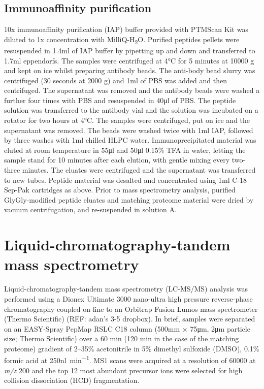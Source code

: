 \subsection{Immunoaffinity purification}
10x immunoaffinity purification (IAP) buffer provided with PTMScan Kit was diluted to 1x concentration with MilliQ-H\textsubscript{2}O.
Purified peptides pellets were resuspended in 1.4ml of IAP buffer by pipetting up and down and transferred to 1.7ml eppendorfs.
The samples were centrifuged at 4\si{\degreeCelsius} for 5 minutes at 10000 g and kept on ice whilst preparing antibody beads.
The anti-body bead slurry was centrifuged (30 seconds at 2000 g) and 1ml of PBS was added and then centrifuged.
The supernatant was removed and the antibody beads were washed a further four times with PBS and resuspended in 40\si{\ul} of PBS.
The peptide solution was transferred to the antibody vial and the solution was incubated on a rotator for two hours at 4\si{\degreeCelsius}.
The samples were centrifuged, put on ice and the supernatant was removed.
The beads were washed twice with 1ml IAP, followed by three washes with 1ml chilled HLPC water.
Immunoprecipitated material was eluted at room temperature in 55\si{\ul} and 50\si{\ul} 0.15\% TFA in water, letting the sample stand for 10 minutes after each elution, with gentle mixing every two-three minutes.
The eluates were centrifuged and the supernatant was transferred to new tubes.
Peptide material was desalted and concentrated using 1\si{\ml} C-18 Sep-Pak cartridges as above.
Prior to mass spectrometry analysis, purified GlyGly-modified peptide eluates and matching proteome material were dried by vacuum centrifugation, and re-suspended in solution A.
%

\section{Liquid-chromatography-tandem mass spectrometry}
Liquid-chromatography-tandem mass spectrometry (LC-MS/MS) analysis was performed using a Dionex Ultimate 3000 nano-ultra high pressure reverse-phase chromatography coupled on-line to an Orbitrap Fusion Lumos mass spectrometer (Thermo Scientific) (REF: adan's 3-5 dropbox).
In brief, samples were separated on an EASY-Spray PepMap RSLC C18 column (500\si{\mm} × 75\si{\um}, 2\si{\um} particle size; Thermo Scientific) over a 60 min (120 min in the case of the matching proteome) gradient of 2–35\% acetonitrile in 5\% dimethyl sulfoxide (DMSO), 0.1\% formic acid at 250\si{\nano\litre\per\minute}.
MS1 scans were acquired at a resolution of 60000 at \textit{m/z} 200 and the top 12 most abundant precursor ions were selected for high collision dissociation (HCD) fragmentation.

